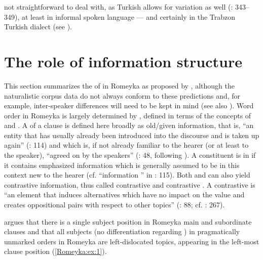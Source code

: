 \documentclass[output=paper,colorlinks,citecolor=brown]{langscibook}
\begin{document}
not straightforward to deal with, as Turkish allows for  variation as well (\citealt{goksel2005turkish}: 343--349), at least in informal spoken language --- and certainly in the Trabzon Turkish dialect (see \citealt{schreiberMuslim}).

\section{The role of information structure}\label{Romeyka:ss:3}

This section summarizes the  of  in Romeyka  as proposed by \citet{neocleousEvolution2022,neocleous_word_2020}, although the naturalistic corpus data do not always conform to these predictions and, for example, inter-speaker differences will need to be kept in mind (see also \citealt{Janse_Schreiber_InPrep}). Word order in Romeyka is largely determined by , defined in terms of the concepts of  and . A  of a clause is defined here broadly as old/given information, that is, ``an entity that has usually already been introduced into the discourse and is taken up again'' (\citealt{bagriacik_pharasiot_2018}: 114) and which is, if not already familiar to the hearer (or at least to the speaker), ``agreed on by the speakers'' (\citealt{solticLate2015}: 48, following \citealt{gundelfretheim2004}). A constituent is in  if it contains emphasized information which is generally assumed to be in this context new to the hearer (cf. ``information '' in \citealt{bagriacik_pharasiot_2018}: 115). Both  and  can also yield contrastive information, thus called contrastive  and contrastive . A contrastive  is ``an element that induces alternatives which have no impact on the  value and creates oppositional pairs with respect to other topics'' (\citealt{frascarellihinterholzl2007}: 88; cf. \citealt{bagriacik_pharasiot_2018}: 267).

\citet[105]{neocleous_word_2020} argues that there is a single subject position in Romeyka main and subordinate clauses and that all subjects (no differentiation regarding ) in pragmatically unmarked orders in Romeyka are left-dislocated topics,{\footnotemark} appearing in the left-most clause position (\ref{Romeyka:ex:1}).
\end{document}
